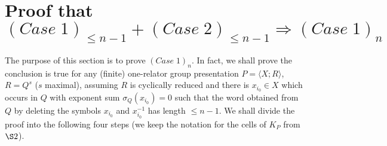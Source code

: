 \documentclass{amsart}[12pt]
\theoremstyle{definition}
\theoremstyle{remark}
\numberwithin{equation}{section}
\begin{document}
\section{Proof that $(Case \; 1)_{\leq n-1} + (Case \; 2)_{\leq n-1} \Rightarrow (Case \; 1)_n$}
The purpose of this section is to prove $(Case \; 1)_n$. In fact,
we shall prove the conclusion is true for any (finite) one-relator
group presentation $P= \langle X;R \rangle$, $R=Q^s$ ($s$
maximal), assuming $R$ is cyclically reduced and there is $x_{i_0}
\in X$ which occurs in $Q$ with exponent sum $\sigma_Q(x_{i_0})=0$
such that the word obtained from $Q$ by deleting the symbols
$x_{i_0}$ and $x_{i_0}^{-1}$ has length $\leq n-1$. We shall
divide the proof into the following four steps
(we keep the notation for the cells of $K_P$ from $\S 2$).\\
\end{document}
